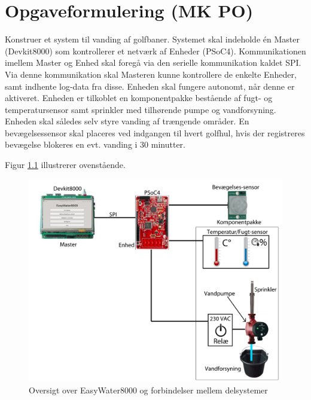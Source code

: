 \chapter{Opgaveformulering (MK PO)}

Konstruer et system til vanding af golfbaner. Systemet skal indeholde én Master (Devkit8000) som kontrollerer et netværk af Enheder (PSoC4). Kommunikationen imellem Master og Enhed skal foregå via den serielle kommunikation kaldet SPI. Via denne kommunikation skal Masteren kunne kontrollere de enkelte Enheder, samt indhente log-data fra disse. 
Enheden skal fungere autonomt, når denne er aktiveret. Enheden  er tilkoblet en komponentpakke bestående af fugt- og temperatursensor samt sprinkler med tilhørende pumpe og vandforsyning. Enheden skal således selv styre vanding af trængende områder. En bevægelsessensor skal placeres ved indgangen til hvert golfhul, hvis der registreres bevægelse blokeres en evt. vanding i 30 minutter.  

Figur \ref{fig:systemoversigt} illustrerer ovenstående.  

\begin{figure}[h]
  \centering
    \includegraphics[width=\textwidth]{Billeder/systemoversigt}
    \caption{Oversigt over EasyWater8000 og forbindelser mellem delsystemer}
    \label{fig:systemoversigt}
\end{figure}
